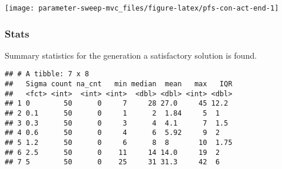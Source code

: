 \documentclass[]{book}
\newenvironment{Shaded}{\begin{snugshade}}{\end{snugshade}}
\newcommand{\DataTypeTok}[1]{\textcolor[rgb]{0.13,0.29,0.53}{#1}}
\newcommand{\DecValTok}[1]{\textcolor[rgb]{0.00,0.00,0.81}{#1}}
\newcommand{\KeywordTok}[1]{\textcolor[rgb]{0.13,0.29,0.53}{\textbf{#1}}}
\newcommand{\NormalTok}[1]{#1}
\newcommand{\OperatorTok}[1]{\textcolor[rgb]{0.81,0.36,0.00}{\textbf{#1}}}
\newcommand{\OtherTok}[1]{\textcolor[rgb]{0.56,0.35,0.01}{#1}}
\newcommand{\StringTok}[1]{\textcolor[rgb]{0.31,0.60,0.02}{#1}}
\begin{document}
\texttt{[image: parameter-sweep-mvc\_files/figure-latex/pfs-con-act-end-1]}

\hypertarget{stats-34}{%
\subsubsection{Stats}\label{stats-34}}

Summary statistics for the generation a satisfactory solution is found.

\begin{Shaded}
\end{Shaded}

\begin{verbatim}
## # A tibble: 7 x 8
##   Sigma count na_cnt   min median  mean   max   IQR
##   <fct> <int>  <int> <int>  <dbl> <dbl> <int> <dbl>
## 1 0        50      0     7     28 27.0     45 12.2 
## 2 0.1      50      0     1      2  1.84     5  1   
## 3 0.3      50      0     3      4  4.1      7  1.5 
## 4 0.6      50      0     4      6  5.92     9  2   
## 5 1.2      50      0     6      8  8       10  1.75
## 6 2.5      50      0    11     14 14.0     19  2   
## 7 5        50      0    25     31 31.3     42  6
\end{verbatim}
\end{document}
